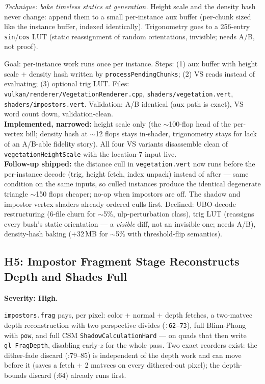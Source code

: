\documentclass[11pt,a4paper]{article}
\begin{document}
\textit{Technique: bake timeless statics at generation.} Height scale and
the density hash never change: append them to a small per-instance aux
buffer (per-chunk sized like the instance buffer, indexed identically).
Trigonometry goes to a 256-entry \texttt{sin}/\texttt{cos} LUT (static
reassignment of random orientations, invisible; needs A/B, not proof).

\begin{tcolorbox}[promptbox={Prompt --- H4: bake per-instance statics}]
Goal: per-instance work runs once per instance. Steps: (1) aux buffer with
height scale + density hash written by \texttt{processPendingChunks};
(2) VS reads instead of evaluating; (3) optional trig LUT. Files:
\texttt{vulkan/renderer/VegetationRenderer.cpp},
\texttt{shaders/vegetation.vert}, \texttt{shaders/impostors.vert}.
Validation: A/B identical (aux path is exact), VS word count down,
validation-clean.
\\ \textbf{Implemented, narrowed:} height scale only (the $\sim$100-flop
head of the per-vertex bill; density hash at $\sim$12 flops stays
in-shader, trigonometry stays for lack of an A/B-able fidelity story).
All four VS variants disassemble clean of \texttt{vegetationHeightScale}
with the location-7 input live.
\\ \textbf{Follow-up shipped:} the distance cull in \texttt{vegetation.vert}
now runs before the per-instance decode (trig, height fetch, index unpack)
instead of after --- same condition on the same inputs, so culled instances
produce the identical degenerate triangle $\sim$150 flops cheaper; no-op
when impostors are off. The shadow and impostor vertex shaders already
ordered culls first. Declined: UBO-decode restructuring (6-file churn for
$\sim$5\%, ulp-perturbation class), trig LUT (reassigns every bush's static
orientation --- a \emph{visible} diff, not an invisible one; needs A/B),
density-hash baking (+32\,MB for $\sim$5\% with threshold-flip semantics).
\end{tcolorbox}

\subsection{H5: Impostor Fragment Stage Reconstructs Depth and Shades Full}
\label{sec:h5}

\textbf{Severity: High.}

\texttt{impostors.frag} pays, per pixel: color + normal + depth fetches, a
two-matvec depth reconstruction with two perspective divides
(\texttt{:62--73}), full Blinn-Phong with \texttt{pow}, and full CSM
\texttt{ShadowCalculationHard} --- on quads that then write
\texttt{gl\_FragDepth}, disabling early-$z$ for the whole pass. Two exact
reorders exist: the dither-fade discard (:79--85) is independent of the
depth work and can move before it (saves a fetch + 2 matvecs on every
dithered-out pixel); the depth-bounds discard (:64) already runs first.
\end{document}
